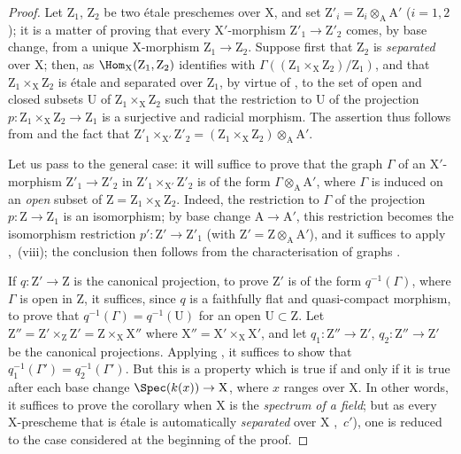 \begin{proof}
Let $\mathrm{Z}_1$, $\mathrm{Z}_2$ be two \'{e}tale preschemes over X, and set $\mathrm{Z}'_i=\mathrm{Z}_i\otimes_{\mathrm{A}}\mathrm{A}'$ ($i=1,2$);
it is a matter of proving that every $\mathrm{X}'$-morphism $\mathrm{Z}'_1\to\mathrm{Z}'_2$ comes, by base change, from a unique X-morphism $\mathrm{Z}_1\to\mathrm{Z}_2$.
Suppose first that $\mathrm{Z}_2$ is \emph{separated} over X;
then, as $\Hom_{\mathrm{X}}(\mathrm{Z}_1,\mathrm{Z}_2)$ identifies with $\Gamma((\mathrm{Z}_1\times_{\mathrm{X}}\mathrm{Z}_2)/\mathrm{Z}_1)$, and that $\mathrm{Z}_1\times_{\mathrm{X}}\mathrm{Z}_2$ is \'{e}tale and separated over $\mathrm{Z}_1$, by virtue of , to the set of open and closed subsets U of $\mathrm{Z}_1\times_{\mathrm{X}}\mathrm{Z}_2$ such that the restriction to U of the projection $p:\mathrm{Z}_1\times_{\mathrm{X}}\mathrm{Z}_2\to\mathrm{Z}_1$ is a surjective and radicial morphism.
The assertion thus follows from  and the fact that $\mathrm{Z}'_1\times_{\mathrm{X}'}\mathrm{Z}'_2=(\mathrm{Z}_1\times_{\mathrm{X}}\mathrm{Z}_2)\otimes_{\mathrm{A}}\mathrm{A}'$.

Let us pass to the general case:
it will suffice to prove that the graph $\Gamma$ of an $\mathrm{X}'$-morphism $\mathrm{Z}'_1\to\mathrm{Z}'_2$ in $\mathrm{Z}'_1\times_{\mathrm{X}'}\mathrm{Z}'_2$ is of the form $\Gamma\otimes_{\mathrm{A}}\mathrm{A}'$, where $\Gamma$ is induced on an \emph{open} subset of $\mathrm{Z}=\mathrm{Z}_1\times_{\mathrm{X}}\mathrm{Z}_2$.
Indeed, the restriction to $\Gamma$ of the projection $p:\mathrm{Z}\to\mathrm{Z}_1$ is an isomorphism;
by base change $\mathrm{A}\to\mathrm{A}'$, this restriction becomes the isomorphism restriction $p':\mathrm{Z}'\to\mathrm{Z}'_1$ (with $\mathrm{Z}'=\mathrm{Z}\otimes_{\mathrm{A}}\mathrm{A}'$), and it suffices to apply ,~(viii);
the conclusion then follows from the characterisation of graphs .

If $q:\mathrm{Z}'\to\mathrm{Z}$ is the canonical projection, to prove $\mathrm{Z}'$ is of the form $q^{-1}(\Gamma)$, where $\Gamma$ is open in Z, it suffices, since $q$ is a faithfully flat and quasi-compact morphism, to prove that $q^{-1}(\Gamma)=q^{-1}(\mathrm{U})$ for an open $\mathrm{U}\subset\mathrm{Z}$.
Let $\mathrm{Z}''=\mathrm{Z}'\times_{\mathrm{Z}}\mathrm{Z}'=\mathrm{Z}\times_{\mathrm{X}}\mathrm{X}''$ where $\mathrm{X}''=\mathrm{X}'\times_{\mathrm{X}}\mathrm{X}'$, and let $q_1:\mathrm{Z}''\to\mathrm{Z}'$, $q_2:\mathrm{Z}''\to\mathrm{Z}'$ be the canonical projections.
Applying , it suffices to show that $q_1^{-1}(\Gamma')=q_2^{-1}(\Gamma')$.
But this is a property which is true if and only if it is true after each base change $\Spec(k(x))\to\mathrm{X}$, where $x$ ranges over X.
In other words, it suffices to prove the corollary when X is the \emph{spectrum of a field};
but as every X-prescheme that is \'{e}tale is automatically \emph{separated} over X ,~$c'$), one is reduced to the case considered at the beginning of the proof.
\end{proof}

